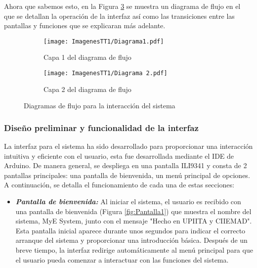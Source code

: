 \documentclass[14pt,oneside]{extarticle} %
\begin{document}
Ahora que sabemos esto, en la Figura \ref{fig:Flujos} se muestra un diagrama de flujo en el que se detallan la operación de la interfaz así como las transiciones entre las pantallas y funciones que se explicaran más adelante. 


\begin{figure}[H]
    \centering
    \begin{subfigure}[b]{0.8\textwidth}
        \centering
        \texttt{[image: ImagenesTT1/Diagrama1.pdf]}
        \caption{Capa 1 del diagrama de flujo}
        \label{fig:Flujo1}
    \end{subfigure}
    \vfill
    \begin{subfigure}[b]{0.8\textwidth}
        \centering
        \texttt{[image: ImagenesTT1/Diagrama 2.pdf]}
        \caption{Capa 2 del diagrama de flujo}
        \label{fig:Flujo2}
    \end{subfigure}
    \caption{Diagramas de flujo para la interacción del sistema}
    \label{fig:Flujos}
\end{figure}

\newpage
\subsubsection{Diseño preliminar y funcionalidad de la interfaz}

La interfaz para el sistema ha sido desarrollado para proporcionar una interacción intuitiva y eficiente con el usuario, esta fue desarrollada mediante el IDE de Arduino. De manera general, se despliega en una pantalla ILI9341 y consta de 2 pantallas principales: una pantalla de bienvenida, un menú principal de opciones. A continuación, se detalla el funcionamiento de cada una de estas secciones:

\begin{itemize}
    \item \textit{\textbf{Pantalla de bienvenida:}} Al iniciar el sistema, el usuario es recibido con una pantalla de bienvenida (Figura \ref{fig:Pantalla1}) que muestra el nombre del sistema, MyE System, junto con el mensaje "Hecho en UPIITA y CIIEMAD". Esta pantalla inicial aparece durante unos segundos para indicar el correcto arranque del sistema y proporcionar una introducción básica. Después de un breve tiempo, la interfaz redirige automáticamente al menú principal para que el usuario pueda comenzar a interactuar con las funciones del sistema.
\end{itemize}
\end{document}
